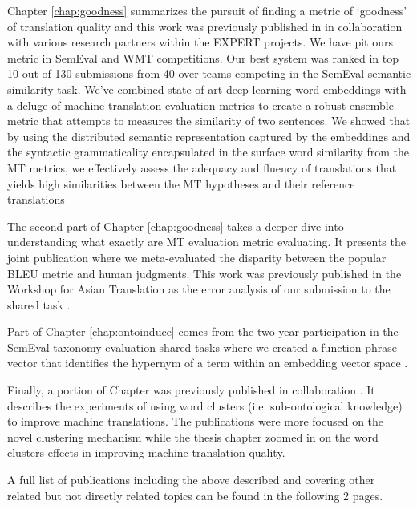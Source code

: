 Chapter \ref{chap:goodness} summarizes the pursuit of finding a metric of `goodness' of translation quality and this work was previously published in \citep{usaarsheff2015,velatan2015,wolvesaar2016} in collaboration with various research partners within the EXPERT projects. We have pit ours metric in SemEval and WMT competitions. Our best system was ranked in top 10 out of 130 submissions from 40 over teams competing in the SemEval semantic similarity task. We've combined state-of-art deep learning word embeddings with a deluge of machine translation evaluation metrics to create a robust ensemble metric that attempts to measures the similarity of two sentences. We showed that by using the distributed semantic representation captured by the embeddings and the syntactic grammaticality encapsulated in the surface word similarity from the MT metrics, we effectively assess the adequacy and fluency of translations that yields high similarities between the MT hypotheses and their reference translations

The second part of Chapter \ref{chap:goodness} takes a deeper dive into understanding what exactly are MT evaluation metric evaluating. It presents the joint publication where we meta-evaluated the disparity between the popular BLEU metric and human judgments. This work was previously published in the Workshop for Asian Translation \citep{WAT2015overview} as the error analysis of our submission to the shared task \citep{awkward2016}. 

Part of Chapter \ref{chap:ontoinduce} comes from the two year participation in the SemEval taxonomy evaluation shared tasks where we created a function phrase vector that identifies the hypernym of a term within an embedding vector space \citep{tan-gupta-vangenabith:2015:SemEval,usaarsemeval2016}.

Finally, a portion of Chapter \label{chap:clustercat} was previously published in collaboration \citep{dehdari-tan-vangenabith:2016:N16-1,dehdari-tan-vangenabith:2016:N16-3}. It describes the experiments of using word clusters (i.e. sub-ontological knowledge) to improve machine translations. The publications were more focused on the novel clustering mechanism while the thesis chapter zoomed in on the word clusters effects in improving machine translation quality.

A full list of publications including the above described and covering other related but not directly related topics can be found in the following 2 pages. 